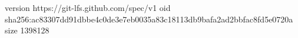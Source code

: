 version https://git-lfs.github.com/spec/v1
oid sha256:ac83307dd91dbbe4c0de3e7eb0035a83c18113db9bafa2ad2bbfac8fd5e0720a
size 1398128
